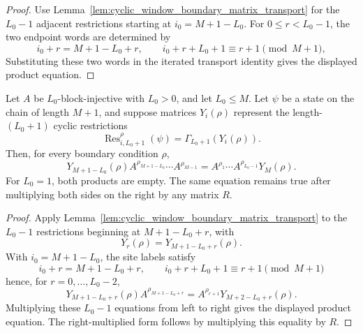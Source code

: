 \begin{proof}
    \leanok
    Use Lemma~\ref{lem:cyclic_window_boundary_matrix_transport} for the
    \(L_0-1\) adjacent restrictions starting at \(i_0=M+1-L_0\). For
    \(0\le r<L_0-1\), the two endpoint words are determined by
    \[
        i_0+r=M+1-L_0+r,\qquad
        i_0+r+L_0+1\equiv r+1 \pmod {M+1},
    \]
    Substituting these two words in the iterated transport identity gives the
    displayed product equation.
\end{proof}

\begin{lemma}
    \label{lem:closure_property_boundary_condition_product_window_witnesses}
    \leanok
    Let $A$ be $L_0$-block-injective with $L_0>0$, and let $L_0\le M$. Let
    $\psi$ be a state on the chain of length $M+1$, and suppose matrices
    $Y_i(\rho)$ represent the length-$(L_0+1)$ cyclic restrictions
    \[
        \operatorname{Res}^{\rho}_{i,L_0+1}(\psi)
        =
        \Gamma_{L_0+1}(Y_i(\rho)).
    \]
    Then, for every boundary condition $\rho$,
    \[
        Y_{M+1-L_0}(\rho)
        A^{\rho_{M+1-L_0}}\cdots A^{\rho_{M-1}}
        =
        A^{\rho_1}\cdots A^{\rho_{L_0-1}}Y_M(\rho).
    \]
    For $L_0=1$, both products are empty.
    The same equation remains true after multiplying both sides on the right by
    any matrix \(R\).
\end{lemma}

\begin{proof}
    \leanok
    Apply Lemma~\ref{lem:cyclic_window_boundary_matrix_transport} to the
    $L_0-1$ restrictions beginning at $M+1-L_0+r$, with
    \[
        Y_r(\rho)=Y_{M+1-L_0+r}(\rho).
    \]
    With $i_0=M+1-L_0$, the site labels satisfy
    \[
        i_0+r=M+1-L_0+r,
        \qquad
        i_0+r+L_0+1\equiv r+1 \pmod {M+1}
    \]
    hence, for $r=0,\ldots,L_0-2$,
    \[
        Y_{M+1-L_0+r}(\rho) A^{\rho_{M+1-L_0+r}}
        =
        A^{\rho_{r+1}}Y_{M+2-L_0+r}(\rho).
    \]
    Multiplying these $L_0-1$ equations from left to right gives the displayed
    product equation. The right-multiplied form follows by multiplying this
    equality by \(R\).
\end{proof}


